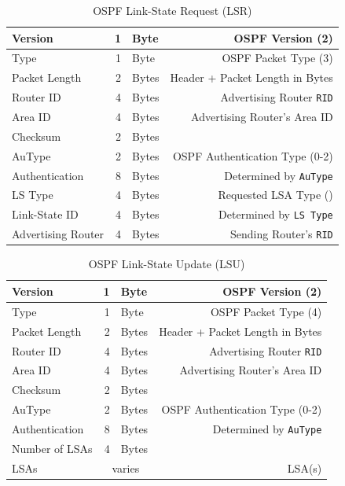 \documentclass[12pt]{article}
\newcommand{\mc}[3]{\multicolumn{#1}{#2}{#3}}
\begin{document}
	\begin{table}[H]
	\centering
	\caption{OSPF Link-State Request (LSR) \label{tab:OSPF LSR}}
	\begin{tabular}{| l | r @{ } l | r |}\hline
	Version			& 1	& Byte	& OSPF Version (2)\\\hline
	Type				& 1	& Byte	& OSPF Packet Type (3)\\\hline
	Packet Length		& 2	& Bytes	& Header + Packet Length in Bytes\\\hline
	Router ID			& 4	& Bytes	& Advertising Router \texttt{RID}\\\hline
	Area ID			& 4	& Bytes	& Advertising Router's Area ID\\\hline
	Checksum			& 2	& Bytes	&\\\hline
	AuType			& 2	& Bytes	& OSPF Authentication Type (0-2)\\\hline
	Authentication		& 8	& Bytes	& Determined by \texttt{AuType}\\\hline
	LS Type			& 4	& Bytes	& Requested LSA Type (\Cref{tab:OSPF LSA TYPES})\\\hline
	Link-State ID		& 4	& Bytes	& Determined by \texttt{LS Type}\\\hline
	Advertising Router	& 4	& Bytes	& Sending Router's \texttt{RID}\\\hline
	\end{tabular}\end{table}

	\begin{table}[H]
	\centering
	\caption{OSPF Link-State Update (LSU) \label{tab:OSPF LSU}}
	\begin{tabular}{| l | r @{ } l | r |}\hline
	Version		& 1	& Byte		& OSPF Version (2)\\\hline
	Type			& 1	& Byte		& OSPF Packet Type (4)\\\hline
	Packet Length	& 2	& Bytes		& Header + Packet Length in Bytes\\\hline
	Router ID		& 4	& Bytes		& Advertising Router \texttt{RID}\\\hline
	Area ID		& 4	& Bytes		& Advertising Router's Area ID\\\hline
	Checksum		& 2	& Bytes		&\\\hline
	AuType		& 2	& Bytes		& OSPF Authentication Type (0-2)\\\hline
	Authentication	& 8	& Bytes		& Determined by \texttt{AuType}\\\hline
	Number of LSAs	& 4	& Bytes		&\\\hline
	LSAs			& \mc{2}{c|}{varies}	& LSA(s)\\\hline
	\end{tabular}\end{table}
\end{document}
